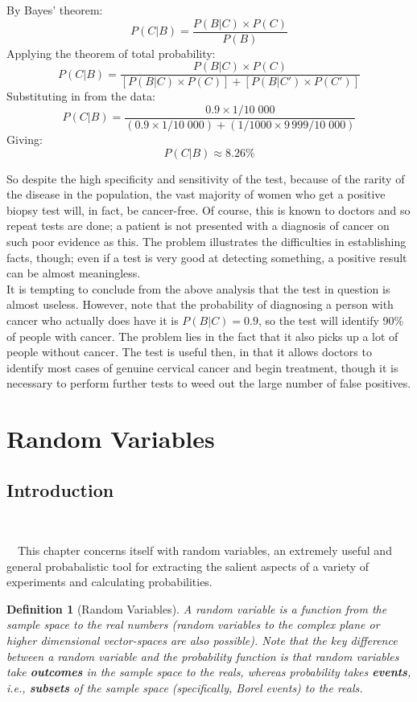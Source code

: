 \documentclass[12pt,a4paper]{article}
\newtheorem{defn}[thm]{Definition}
\begin{document}
By Bayes' theorem:
$$P(C|B) = \frac{P(B|C) \times P(C)}{P(B)}$$
Applying the theorem of total probability:
$$P(C|B) = \frac{P(B|C) \times P(C)}{[P(B|C) \times P(C)] + [P(B|C') \times P(C')]}$$
Substituting in from the data:
$$P(C|B) = \frac{0.9 \times 1/10\;000}{(0.9 \times 1/10\;000) + (1/1000 \times 9\,999/10\;000)}$$
Giving:
$$P(C|B) \approx 8.26\%$$

So despite the high specificity and sensitivity of the test, because of the rarity of the disease in the population, the vast majority of women who get a positive biopsy test will, in fact, be cancer-free. Of course, this is known to doctors and so repeat tests are done; a patient is not presented with a diagnosis of cancer on such poor evidence as this. The problem illustrates the difficulties in establishing facts, though; even if a test is very good at detecting something, a positive result can be almost meaningless.\\
\indent It is tempting to conclude from the above analysis that the test in question is almost useless. However, note that the probability of diagnosing a person with cancer who actually does have it is $P(B|C) = 0.9$, so the test will identify 90\% of people with cancer. The problem lies in the fact that it also picks up a lot of people without cancer. The test is useful then, in that it allows doctors to identify most cases of genuine cervical cancer and begin treatment, though it is necessary to perform further tests to weed out the large number of false positives.

\clearpage
\section{Random Variables}

\subsection{Introduction}$\;$

$\quad$This chapter concerns itself with random variables, an extremely useful and general probabalistic tool for extracting the salient aspects of a variety of experiments and calculating probabilities.

\begin{defn}[Random Variables]
\vspace{1cm}

A random variable is a function from the sample space to the real numbers (random variables to the complex plane or higher dimensional vector-spaces are also possible). Note that the key difference between a random variable and the probability function is that random variables take {\bf outcomes} in the sample space to the reals, whereas probability takes {\bf events}, i.e., {\bf subsets} of the sample space (specifically, Borel events) to the reals.
\end{defn}
\end{document}
